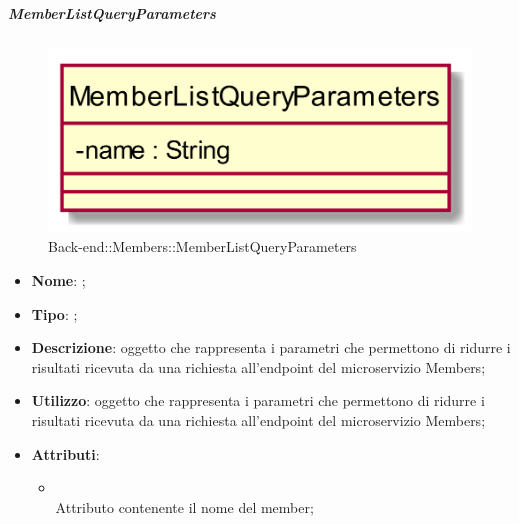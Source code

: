 \hypertarget{MemberListQueryParameters_label}{\subparagraph{MemberListQueryParameters}}
\begin{figure}[h]
	\centering
	\includegraphics[width=\textwidth,height=\textheight,keepaspectratio]{images/ClassMemberListQueryParameters.png}
	\caption{Back-end::Members::MemberListQueryParameters}
\end{figure}
\begin{itemize}
	\item \textbf{Nome}: ;
	\item \textbf{Tipo}: ;
	\item \textbf{Descrizione}: oggetto che rappresenta i parametri che permettono di ridurre i risultati ricevuta da una richiesta all'endpoint  del microservizio Members;
	\item \textbf{Utilizzo}: oggetto che rappresenta i parametri che permettono di ridurre i risultati ricevuta da una richiesta all'endpoint  del microservizio Members;
	\item \textbf{Attributi}:
	\begin{itemize}
		\item[]  \\
		Attributo contenente il nome del member;
	\end{itemize}
\end{itemize}
\FloatBarrier


